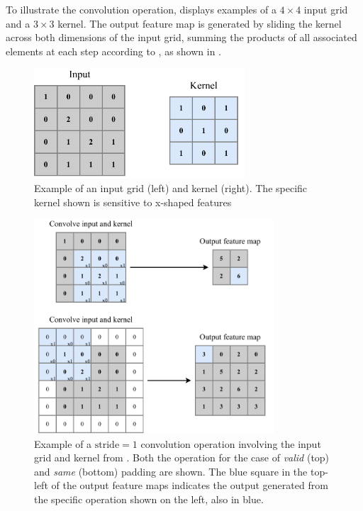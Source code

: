 To illustrate the convolution operation,  displays examples of a $4
\times 4$ input grid and a $3 \times 3$ kernel. The output feature map is generated by sliding the
kernel across both dimensions of the input grid, summing the products of all associated elements
at each step according to , as shown in .

\begin{figure} %
    \includegraphics[width=0.7\textwidth]{diagrams/6-cnn/conv_input.pdf}
    \caption[Example of a Convolutional Neural Network input grid and kernel]
    {Example of an input grid (left) and kernel (right). The specific kernel shown is sensitive to
        x-shaped features}
    \label{fig:conv_input}
\end{figure}

\begin{figure} %
    \includegraphics[width=0.8\textwidth]{diagrams/6-cnn/conv_operation.pdf}
    \caption[Example of a convolution operation]
    {Example of a $\text{stride}=1$ convolution operation involving the input grid and kernel from
        . Both the operation for the case of \emph{valid} (top) and
        \emph{same} (bottom) padding are shown. The blue square in the top-left of the output
        feature maps indicates the output generated from the specific operation shown on the left,
        also in blue.}
    \label{fig:conv_operation}
\end{figure}

